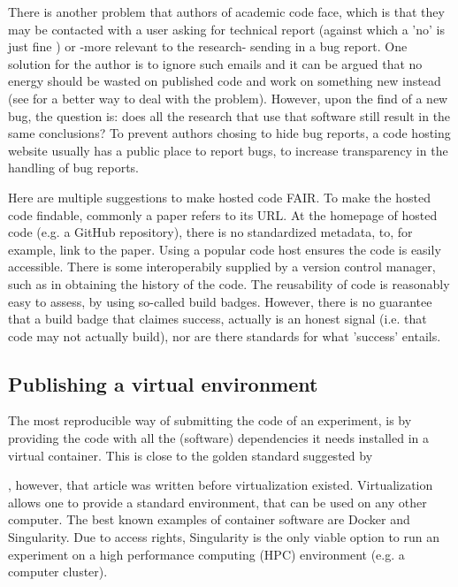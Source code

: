 There is another problem that authors of academic code face,
which is that they may be contacted with a user 
asking for technical report 
(against which a 'no' is just fine \cite{barnes2010publish})
or -more relevant to the research- sending in a bug report.
One solution for the author is to ignore such emails
and it can be argued that no energy should be wasted on published code
and work on something new instead 
(see \cite{barnes2010publish} for a better way to deal with the problem).
However, upon the find of a new bug, the question is:
does all the research that use that software still 
result in the same conclusions?
To prevent authors chosing to hide bug reports, 
a code hosting website usually has a public place to report bugs,
to increase transparency in the handling of bug reports.


Here are multiple suggestions to make hosted code FAIR.
To make the hosted code findable, commonly a paper refers to its URL.
At the homepage of hosted code (e.g. a GitHub repository), 
there is no standardized metadata, to,
for example, link to the paper.
Using a popular code host ensures the code is easily accessible.
There is some interoperabily supplied by a version control manager,
such as in obtaining the history of the code.
The reusability of code is reasonably easy to assess, 
by using so-called build badges.
However, there is no guarantee that a build badge that claimes success,
actually is an honest signal (i.e. that code may not actually build),
nor are there standards for what 'success' entails.

\subsection{Publishing a virtual environment}

The most reproducible way of submitting the code of an experiment,
is by providing the code with all the (software) dependencies 
it needs installed in a virtual container.
This is close to the golden standard suggested by 
\cite{peng2011reproducible} 

,
however, that article was written before virtualization existed.
Virtualization allows one to provide a standard environment,
that can be used on any other computer.
The best known examples of container software are Docker and Singularity.
Due to access rights, Singularity is the only viable option to run
an experiment on a 
high performance computing (HPC) environment (e.g. a computer cluster).

